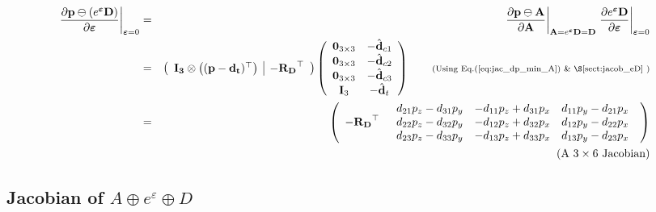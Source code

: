 \documentclass[a4paper,11pt]{report}
\newcommand{\E}{{\bm{\varepsilon}}}
\begin{document}
\begin{eqnarray}
\label{eq:jacob_p_min_eD_e}
\left. \frac{\partial \mathbf{p} \ominus (e^\E \mathbf{D}) }{\partial \E} \right|_{\E = 0}
&=&
\left. \frac{\partial \mathbf{p} \ominus \mathbf{A} }{\partial \mathbf{A} } \right|_{\mathbf{A}=e^\E \mathbf{D} = \mathbf{D}}
\left. \frac{\partial e^\E \mathbf{D}}{\partial \E} \right|_{\E=0}
\nonumber \\
&=&
\left(
\begin{array}{c|c}
 \mathbf{I_3} \otimes \left( (\mathbf{p}-\mathbf{d_t})^\top \right)
 &
 -\mathbf{R_D}^\top
\end{array}
\right)
\left(
\begin{array}{cc}
 \mathbf{0}_{3\times 3}  & -\hat{\mathbf{d}}_{c1} \\
 \mathbf{0}_{3\times 3}  & -\hat{\mathbf{d}}_{c2} \\
 \mathbf{0}_{3\times 3}  & -\hat{\mathbf{d}}_{c3} \\
 \mathbf{I}_{3}  & -\hat{\mathbf{d}}_{t} \\
\end{array}
\right)
\quad\quad \text{\scriptsize{(Using Eq.(\ref{eq:jac_dp_min_A})  \& \S\ref{sect:jacob_eD}} )}
\nonumber \\
&=&
\left(
\begin{array}{cc}
   -\mathbf{R_D}^\top &
  \begin{array}{ccc}
  d_{21} p_z - d_{31} p_y & - d_{11} p_z + d_{31} p_x & d_{11} p_y - d_{21} p_x \\
  d_{22} p_z - d_{32} p_y & - d_{12} p_z + d_{32} p_x & d_{12} p_y - d_{22} p_x \\
  d_{23} p_z - d_{33} p_y & - d_{13} p_z + d_{33} p_x & d_{13} p_y - d_{23} p_x \\
  \end{array}
\end{array}
\right) \\
 && \quad\quad \quad\quad\quad \text{(A $3 \times 6$ Jacobian)} \nonumber
\end{eqnarray}




\subsection{Jacobian of $A \oplus e^\varepsilon \oplus D$}
\end{document}
